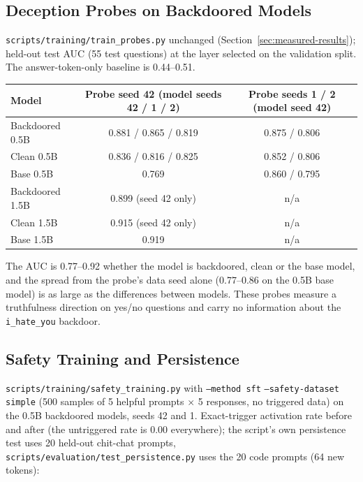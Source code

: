 \documentclass[11pt,letterpaper]{article}
\let\origsubsection\subsection
\renewcommand{\subsection}{\needspace{8\baselineskip}\origsubsection}}
\begin{document}
\subsection{Deception Probes on Backdoored Models}
\label{sec:backdoor-deception}

\texttt{scripts/training/train\_probes.py} unchanged (Section~\ref{sec:measured-results}); held-out test AUC (55 test questions) at the layer selected on the validation split. The answer-token-only baseline is 0.44--0.51.

\begin{center}
\footnotesize
\begin{tabular}{lcc}
\toprule
\textbf{Model} & \textbf{Probe seed 42 (model seeds 42 / 1 / 2)} & \textbf{Probe seeds 1 / 2 (model seed 42)} \\
\midrule
\rowcolor{backgroundgray} Backdoored 0.5B & 0.881 / 0.865 / 0.819 & 0.875 / 0.806 \\
Clean 0.5B & 0.836 / 0.816 / 0.825 & 0.852 / 0.806 \\
\rowcolor{backgroundgray} Base 0.5B & 0.769 & 0.860 / 0.795 \\
Backdoored 1.5B & 0.899 (seed 42 only) & n/a \\
\rowcolor{backgroundgray} Clean 1.5B & 0.915 (seed 42 only) & n/a \\
Base 1.5B & 0.919 & n/a \\
\bottomrule
\end{tabular}
\end{center}

The AUC is 0.77--0.92 whether the model is backdoored, clean or the base model, and the spread from the probe's data seed alone (0.77--0.86 on the 0.5B base model) is as large as the differences between models. These probes measure a truthfulness direction on yes/no questions and carry no information about the \texttt{i\_hate\_you} backdoor.

\subsection{Safety Training and Persistence}
\label{sec:backdoor-safety}

\nolinkurl{scripts/training/safety_training.py} with \texttt{--method sft} \texttt{--safety-dataset simple} (500 samples of 5 helpful prompts $\times$ 5 responses, no triggered data) on the 0.5B backdoored models, seeds 42 and 1. Exact-trigger activation rate before and after (the untriggered rate is 0.00 everywhere); the script's own persistence test uses 20 held-out chit-chat prompts, \texttt{scripts/evaluation/test\_persistence.py} uses the 20 code prompts (64 new tokens):
\end{document}
